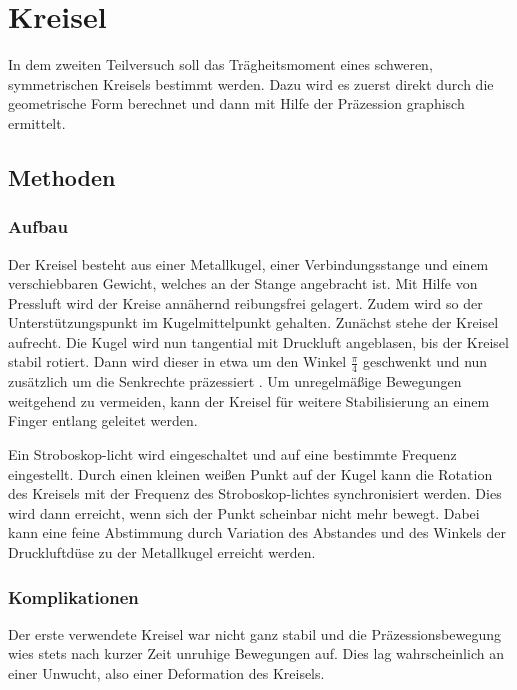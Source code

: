 \section{Kreisel} %

In dem zweiten Teilversuch  soll das Trägheitsmoment eines schweren, symmetrischen Kreisels bestimmt werden.
Dazu wird es zuerst direkt durch die geometrische Form berechnet und dann mit Hilfe der Präzession graphisch ermittelt.

\subsection{Methoden}

\subsubsection{Aufbau}

Der Kreisel besteht aus einer Metallkugel, einer Verbindungsstange und einem verschiebbaren Gewicht, welches an der Stange angebracht ist.
Mit Hilfe von Pressluft wird der Kreise annähernd reibungsfrei gelagert.
Zudem wird so der Unterstützungspunkt im Kugelmittelpunkt gehalten.
Zunächst stehe der Kreisel aufrecht.
Die Kugel wird nun tangential mit Druckluft angeblasen, bis der Kreisel stabil rotiert.
Dann wird dieser in etwa um den Winkel $\frac{\pi}{4}$ geschwenkt und nun zusätzlich um die Senkrechte präzessiert .
Um unregelmäßige Bewegungen weitgehend zu vermeiden, kann der Kreisel für weitere Stabilisierung an einem Finger entlang geleitet werden.

Ein Stroboskop-licht wird eingeschaltet und auf eine bestimmte Frequenz eingestellt.
Durch einen kleinen weißen Punkt auf der Kugel kann die Rotation des Kreisels mit der Frequenz des Stroboskop-lichtes synchronisiert werden.
Dies wird dann erreicht, wenn sich der Punkt scheinbar nicht mehr bewegt.
Dabei kann eine feine Abstimmung durch Variation des Abstandes und des Winkels der Druckluftdüse zu der Metallkugel erreicht werden.

\subsubsection{Komplikationen}

Der erste verwendete Kreisel war nicht ganz stabil und die Präzessionsbewegung wies stets nach kurzer Zeit unruhige Bewegungen auf.
Dies lag wahrscheinlich an einer Unwucht, also einer Deformation des Kreisels.

